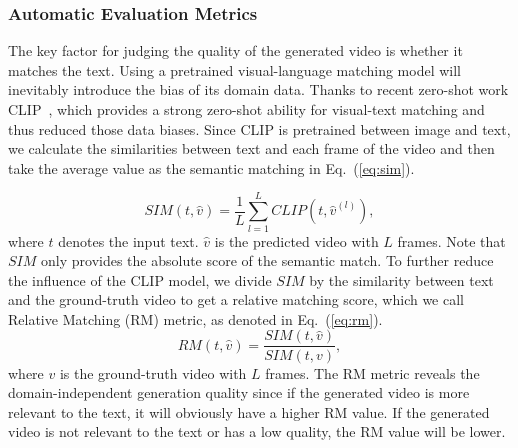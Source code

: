 \documentclass{article}
\begin{document}
\subsubsection{Automatic Evaluation Metrics} \label{sec:rmm}
The key factor for judging the quality of the generated video is whether it matches the text. Using a pretrained visual-language matching model will inevitably introduce the bias of its domain data. Thanks to recent zero-shot work CLIP~\cite{radfordLearningTransferableVisual2021}, which provides a strong zero-shot ability for visual-text matching and thus reduced those data biases. Since CLIP is pretrained between image and text, we calculate the similarities between text and each frame of the video and then take the average value as the semantic matching in Eq.~(\ref{eq:sim}).

   \begin{equation} \label{eq:sim} 
SIM(t, \hat{v})= \frac{1}{L}\sum_{l=1}^{L}CLIP(t, \hat{v}^{(l)}),
\end{equation}where $t$ denotes the input text. $\hat{v}$ is the predicted video with $L$ frames.  Note that $SIM$ only provides the absolute score of the semantic match. To further reduce the influence of the CLIP model, we divide $SIM$ by the similarity between text and the ground-truth video to get a relative matching score, which we call Relative Matching (RM) metric, as denoted in Eq.~(\ref{eq:rm}).
\begin{equation} \label{eq:rm} 
RM(t, \hat{v})= \frac{SIM(t, \hat{v})}{SIM(t, v)},
\end{equation}
where $v$ is the ground-truth video with $L$ frames. The RM metric reveals the domain-independent generation quality since if the generated video is more relevant to the text, it will obviously have a higher RM value. If the generated video is not relevant to the text or has a low quality, the RM value will be lower.
\end{document}

